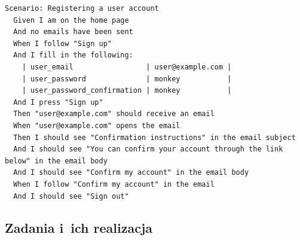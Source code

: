  \label{code.simpleruby}
\begin{lstlisting}
Scenario: Registering a user account
  Given I am on the home page
  And no emails have been sent
  When I follow "Sign up"
  And I fill in the following:
    | user_email                 | user@example.com |
    | user_password              | monkey           |
    | user_password_confirmation | monkey           |
  And I press "Sign up"
  Then "user@example.com" should receive an email
  When "user@example.com" opens the email
  Then I should see "Confirmation instructions" in the email subject
  And I should see "You can confirm your account through the link below" in the email body
  And I should see "Confirm my account" in the email body
  When I follow "Confirm my account" in the email
  And I should see "Sign out"
\end{lstlisting}

\newpage

\subsection{Zadania i~ich realizacja}

